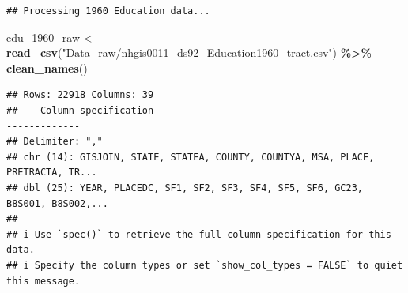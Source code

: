 \documentclass[
]{article}
\newenvironment{Shaded}{\begin{snugshade}}{\end{snugshade}}
\newcommand{\FunctionTok}[1]{\textcolor[rgb]{0.13,0.29,0.53}{\textbf{#1}}}
\newcommand{\NormalTok}[1]{#1}
\newcommand{\OtherTok}[1]{\textcolor[rgb]{0.56,0.35,0.01}{#1}}
\newcommand{\SpecialCharTok}[1]{\textcolor[rgb]{0.81,0.36,0.00}{\textbf{#1}}}
\newcommand{\StringTok}[1]{\textcolor[rgb]{0.31,0.60,0.02}{#1}}
\begin{document}
\begin{verbatim}
## Processing 1960 Education data...
\end{verbatim}

\begin{Shaded}
\begin{Highlighting}[]
\NormalTok{edu\_1960\_raw }\OtherTok{\textless{}{-}} \FunctionTok{read\_csv}\NormalTok{(}\StringTok{"Data\_raw/nhgis0011\_ds92\_Education1960\_tract.csv"}\NormalTok{) }\SpecialCharTok{\%\textgreater{}\%} \FunctionTok{clean\_names}\NormalTok{()}
\end{Highlighting}
\end{Shaded}

\begin{verbatim}
## Rows: 22918 Columns: 39
## -- Column specification --------------------------------------------------------
## Delimiter: ","
## chr (14): GISJOIN, STATE, STATEA, COUNTY, COUNTYA, MSA, PLACE, PRETRACTA, TR...
## dbl (25): YEAR, PLACEDC, SF1, SF2, SF3, SF4, SF5, SF6, GC23, B8S001, B8S002,...
## 
## i Use `spec()` to retrieve the full column specification for this data.
## i Specify the column types or set `show_col_types = FALSE` to quiet this message.
\end{verbatim}
\end{document}

